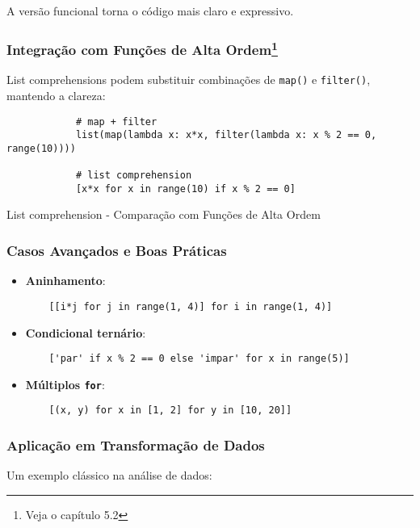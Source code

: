 \documentclass[date,twocolumn,a4paper]{ppgem}
\begin{document}
    A versão funcional torna o código mais claro e expressivo.
    \subsubsection{Integração com Funções de Alta Ordem\footnote{Veja o capítulo 5.2}}
    List comprehensions podem substituir combinações de \texttt{map()} e \texttt{filter()}, mantendo a clareza:

    \begin{listing}[!ht]
        \begin{verbatim}
            # map + filter
            list(map(lambda x: x*x, filter(lambda x: x % 2 == 0, range(10))))

            # list comprehension
            [x*x for x in range(10) if x % 2 == 0]
        \end{verbatim}
        \caption{List comprehension - Comparação com Funções de Alta Ordem}
        \label{listing:2}
    \end{listing}

    \subsubsection{Casos Avançados e Boas Práticas}
    \begin{itemize}
    \item \textbf{Aninhamento}:
    \begin{verbatim}
    [[i*j for j in range(1, 4)] for i in range(1, 4)]
    \end{verbatim}
    \item \textbf{Condicional ternário}:
    \begin{verbatim}
    ['par' if x % 2 == 0 else 'impar' for x in range(5)]
    \end{verbatim}
    \item \textbf{Múltiplos \texttt{for}}:
    \begin{verbatim}
    [(x, y) for x in [1, 2] for y in [10, 20]]
    \end{verbatim}
    \end{itemize}

    \subsubsection{Aplicação em Transformação de Dados}
    Um exemplo clássico na análise de dados:
\end{document}
